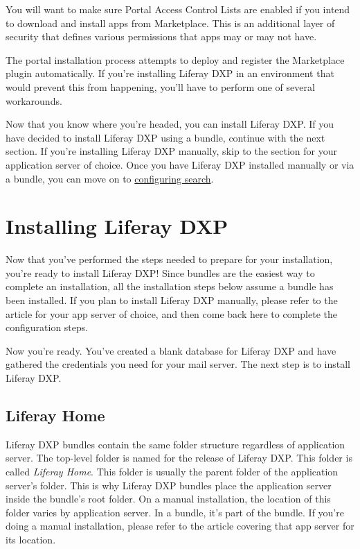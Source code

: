 You will want to make sure Portal Access Control Lists are enabled if
you intend to download and install apps from Marketplace. This is an
additional layer of security that defines various permissions that apps
may or may not have.

The portal installation process attempts to deploy and register the
Marketplace plugin automatically. If you're installing Liferay DXP in an
environment that would prevent this from happening, you'll have to
perform one of several workarounds.

Now that you know where you're headed, you can install Liferay DXP. If
you have decided to install Liferay DXP using a bundle, continue with
the next section. If you're installing Liferay DXP manually, skip to the
section for your application server of choice. Once you have Liferay DXP
installed manually or via a bundle, you can move on to
\href{/docs/7-0/deploy/-/knowledge_base/d/installing-elasticsearch}{configuring
search}.

\section{Installing Liferay DXP}\label{installing-liferay-dxp}

Now that you've performed the steps needed to prepare for your
installation, you're ready to install Liferay DXP! Since bundles are the
easiest way to complete an installation, all the installation steps
below assume a bundle has been installed. If you plan to install Liferay
DXP manually, please refer to the article for your app server of choice,
and then come back here to complete the configuration steps.

Now you're ready. You've created a blank database for Liferay DXP and
have gathered the credentials you need for your mail server. The next
step is to install Liferay DXP.

\subsection{Liferay Home}\label{liferay-home}

Liferay DXP bundles contain the same folder structure regardless of
application server. The top-level folder is named for the release of
Liferay DXP. This folder is called \emph{Liferay Home}. This folder is
usually the parent folder of the application server's folder. This is
why Liferay DXP bundles place the application server inside the bundle's
root folder. On a manual installation, the location of this folder
varies by application server. In a bundle, it's part of the bundle. If
you're doing a manual installation, please refer to the article covering
that app server for its location.

